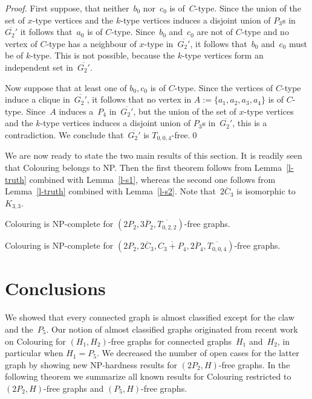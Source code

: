 \documentclass{llncs}
\newcommand{\NP}{{\sf NP}}
\begin{document}
\begin{proof}
First suppose, that neither~$b_0$ nor~$c_0$ is of~$C$-type.
Since the union of the set of $x$-type vertices and the $k$-type vertices induces a disjoint union of $P_3$s in~$\overline{G_2'}$ it follows that~$a_0$ is of $C$-type.
Since~$b_0$ and~$c_0$ are not of $C$-type and no vertex of $C$-type has a neighbour of $x$-type in~$\overline{G_2'}$, it follows that~$b_0$ and~$c_0$ must be of $k$-type.
This is not possible, because the $k$-type vertices form an independent set in~$\overline{G_2'}$.

Now suppose that at least one of $b_0,c_0$ is of $C$-type.
Since the vertices of $C$-type induce a clique in~$\overline{G_2'}$, it follows that no vertex in $A:=\{a_1,a_2,a_3,a_4\}$ is of $C$-type.
Since~$A$ induces a~$P_4$ in~$\overline{G_2'}$, but the union of the set of $x$-type vertices and the $k$-type vertices induces a disjoint union of $P_3$s in~$\overline{G_2'}$, this is a contradiction.
We conclude that~$\overline{G_2'}$ is $T_{0,0,4}$-free.\qed
\end{proof}

We are now ready to state the two main results of this section.
It is readily seen that {\sc Colouring} belongs to \NP.
Then the first theorem follows from Lemma~\ref{l-truth} combined with Lemma~\ref{l-s1}, whereas the second one follows from Lemma~\ref{l-truth} combined with Lemma~\ref{l-s2}.
Note that~$\overline{2C_3}$ is isomorphic to~$K_{3,3}$.

\begin{theorem}\label{t-1}
{\sc Colouring} is \NP-complete for $(2P_2,\overline{3P_2},\overline{T_{0,2,2}})$-free graphs.
\end{theorem}

\begin{theorem}\label{t-2}
{\sc Colouring} is \NP-complete for $(2P_2,\overline{2C_3},\overline{C_3+P_4},\overline{2P_4},\overline{T_{0,0,4}})$-free graphs.
\end{theorem}

\section{Conclusions}\label{s-con}

We showed that every connected graph is almost classified except for the claw and the~$P_5$.
Our notion of almost classified graphs originated from recent work~\cite{HL,KMP,Ma,ML17} on {\sc Colouring} for $(H_1,H_2)$-free graphs for connected graphs~$H_1$ and~$H_2$, in particular when $H_1=P_5$.
We decreased the number of open cases for the latter graph by showing new \NP-hardness results for $(2P_2,H)$-free graphs.
In the following theorem we summarize all known results for {\sc Colouring} restricted to $(2P_2,H)$-free graphs and $(P_5,H)$-free graphs.
\end{document}
